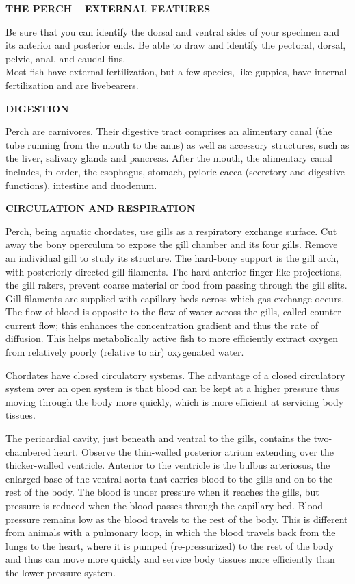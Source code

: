 \documentclass[
]{book}
\begin{document}
\textbf{THE PERCH -- EXTERNAL FEATURES}

Be sure that you can identify the dorsal and ventral sides of your specimen and its anterior and
posterior ends. Be able to draw and identify the pectoral, dorsal, pelvic, anal, and caudal fins.\\
Most fish have external fertilization, but a few species, like guppies, have internal fertilization and are livebearers.

\textbf{DIGESTION}

Perch are carnivores. Their digestive tract comprises an alimentary canal (the tube running from the mouth to the anus) as well as accessory structures, such as the liver, salivary glands and pancreas. After the mouth, the alimentary canal includes, in order, the esophagus, stomach, pyloric caeca (secretory and digestive functions), intestine and duodenum.

\textbf{CIRCULATION AND RESPIRATION}

Perch, being aquatic chordates, use gills as a respiratory exchange surface. Cut away the bony
operculum to expose the gill chamber and its four gills. Remove an individual gill to study its structure. The hard-bony support is the gill arch, with posteriorly directed gill filaments. The hard-anterior finger-like projections, the gill rakers, prevent coarse material or food from passing through the gill slits. Gill filaments are supplied with capillary beds across which gas exchange occurs. The flow of blood is opposite to the flow of water across the gills, called counter-current flow; this enhances the concentration gradient and thus the rate of diffusion. This helps metabolically active fish to more efficiently extract oxygen from relatively poorly (relative to air) oxygenated water.

Chordates have closed circulatory systems. The advantage of a closed circulatory system over an open system is that blood can be kept at a higher pressure thus moving through the body more quickly, which is more efficient at servicing body tissues.

The pericardial cavity, just beneath and ventral to the gills, contains the two-chambered heart. Observe the thin-walled posterior atrium extending over the thicker-walled ventricle. Anterior to the ventricle is the bulbus arteriosus, the enlarged base of the ventral aorta that carries blood to the gills and on to the rest of the body. The blood is under pressure when it reaches the gills, but pressure is reduced when the blood passes through the capillary bed. Blood pressure remains low as the blood travels to the rest of the body. This is different from animals with a pulmonary loop, in which the blood travels back from the lungs to the heart, where it is pumped (re-pressurized) to the rest of the body and thus can move more quickly and service body tissues more efficiently than the lower pressure system.
\end{document}
